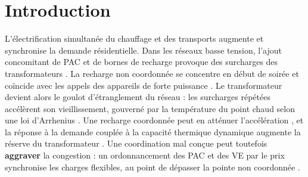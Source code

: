 \documentclass[conference]{IEEEtran}
\begin{document}
\par{}\par\smallskip

\section{Introduction}

L'électrification simultanée du chauffage et des transports augmente et synchronise la demande résidentielle. Dans les réseaux basse tension, l'ajout concomitant de PAC et de bornes de recharge provoque des surcharges des transformateurs \cite{NavarroEspinosa2016, Protopapadaki2017, Tun2025}. La recharge non coordonnée se concentre en début de soirée \cite{Muratori2018} et coïncide avec les appels des appareils de forte puissance \cite{Poore2024}. Le transformateur devient alors le goulot d'étranglement du réseau : les surcharges répétées accélèrent son vieillissement, gouverné par la température du point chaud selon une loi d'Arrhenius \cite{IEEEC5791_2025, IEC60076_7_2018}. Une recharge coordonnée peut en atténuer l'accélération \cite{Hilshey2013}, et la réponse à la demande couplée à la capacité thermique dynamique augmente la réserve du transformateur \cite{Daminov2021}. Une coordination mal conçue peut toutefois \textbf{aggraver} la congestion : un ordonnancement des PAC et des VE par le prix synchronise les charges flexibles, au point de dépasser la pointe non coordonnée \cite{Hein2026, Faddel2023}.
\end{document}

